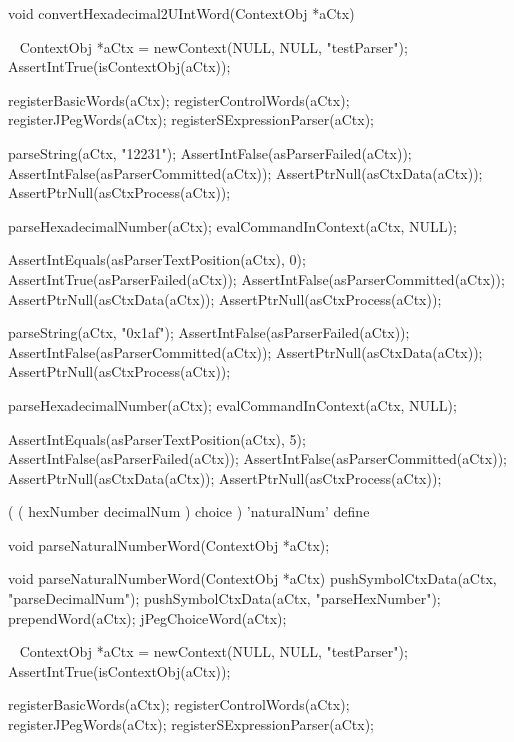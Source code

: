 void convertHexadecimal2UIntWord(ContextObj *aCtx) {
  
}
\stopCCode

\CTestsSuiteSetup\
\startCTest
  ContextObj *aCtx = newContext(NULL, NULL, "testParser");
  AssertIntTrue(isContextObj(aCtx));
  
  registerBasicWords(aCtx);
  registerControlWords(aCtx);
  registerJPegWords(aCtx);
  registerSExpressionParser(aCtx);
\stopCTest

\startCTest
  parseString(aCtx, "12231");
  AssertIntFalse(asParserFailed(aCtx));
  AssertIntFalse(asParserCommitted(aCtx));
  AssertPtrNull(asCtxData(aCtx));
  AssertPtrNull(asCtxProcess(aCtx));
  
  parseHexadecimalNumber(aCtx);
  evalCommandInContext(aCtx, NULL);
  
  AssertIntEquals(asParserTextPosition(aCtx), 0);
  AssertIntTrue(asParserFailed(aCtx));
  AssertIntFalse(asParserCommitted(aCtx));
  AssertPtrNull(asCtxData(aCtx));
  AssertPtrNull(asCtxProcess(aCtx));
\stopCTest
\stopTestCase

\startCTest
  parseString(aCtx, "0x1af");
  AssertIntFalse(asParserFailed(aCtx));
  AssertIntFalse(asParserCommitted(aCtx));
  AssertPtrNull(asCtxData(aCtx));
  AssertPtrNull(asCtxProcess(aCtx));
  
  parseHexadecimalNumber(aCtx);
  evalCommandInContext(aCtx, NULL);
  
  AssertIntEquals(asParserTextPosition(aCtx), 5);
  AssertIntFalse(asParserFailed(aCtx));
  AssertIntFalse(asParserCommitted(aCtx));
  AssertPtrNull(asCtxData(aCtx));
  AssertPtrNull(asCtxProcess(aCtx));
\stopCTest
\stopTestCase
\stopTestSuite

\startTestSuite[parseNaturalNumberWord]

\starttyping
(
  ( hexNumber decimalNum ) choice
) 'naturalNum' define
\stoptyping

\startCHeader
void parseNaturalNumberWord(ContextObj *aCtx);
\stopCHeader

\startCCode
void parseNaturalNumberWord(ContextObj *aCtx) {
  pushSymbolCtxData(aCtx, "parseDecimalNum");
  pushSymbolCtxData(aCtx, "parseHexNumber");
  prependWord(aCtx);
  jPegChoiceWord(aCtx);
}
\stopCCode

\CTestsSuiteSetup\
\startCTest
  ContextObj *aCtx = newContext(NULL, NULL, "testParser");
  AssertIntTrue(isContextObj(aCtx));
  
  registerBasicWords(aCtx);
  registerControlWords(aCtx);
  registerJPegWords(aCtx);
  registerSExpressionParser(aCtx);
\stopCTest

